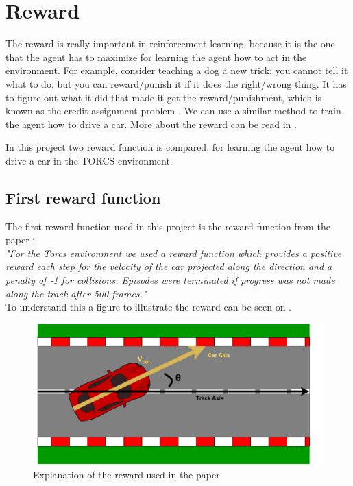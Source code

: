 \section{Reward}\label{sectionReward}
The reward is really important in reinforcement learning, because it is the one that the agent has to maximize for learning the agent how to act in the environment. For example, consider teaching a dog a new trick: you cannot tell it what to do, but you can reward/punish it if it does the right/wrong thing. It has to figure out what it did that made it get the reward/punishment, which is known as the credit assignment problem \cite{reward_small}. We can use a similar method to train the agent how to drive a car. More about the reward can be read in . 
	
In this project two reward function is compared, for learning the agent how to drive a car in the TORCS environment.  

\subsection*{First reward function}
The first reward function used in this project is the reward function from the paper \cite{DBLP:journals/corr/LillicrapHPHETS15}: \\
\textit{"For the Torcs environment we used a reward function which provides a positive reward each step for the velocity of the car projected along the direction and a penalty of -1 for collisions. Episodes were terminated if progress was not made along the track after 500 frames."}\\
To understand this a figure to illustrate the reward can be seen on .

\begin{figure}[H]
	\centering
	\includegraphics[width=1\textwidth]{Figures/Result/Reward_paper.pdf}
	\caption{Explanation of the reward used in the paper \cite{DBLP:journals/corr/LillicrapHPHETS15} }
	\label{fig:Reward_paper}
\end{figure}

